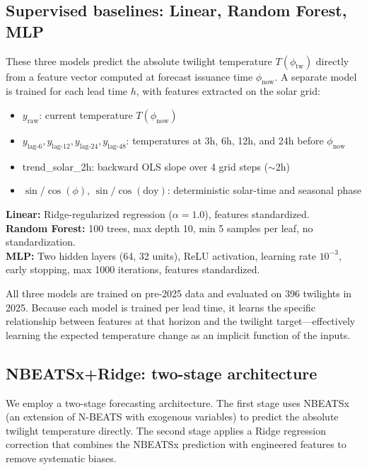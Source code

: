 \documentclass[]{spie}  %
\begin{document}
\subsection{Supervised baselines: Linear, Random Forest, MLP}
\label{sec:methods:baselines}

These three models predict the absolute twilight temperature $T(\phi_{\text{tw}})$ directly from a feature vector computed at forecast issuance time $\phi_{\text{now}}$. A separate model is trained for each lead time $h$, with features extracted on the solar grid:
\begin{itemize}[noitemsep]
    \item $y_{\text{raw}}$: current temperature $T(\phi_{\text{now}})$
    \item $y_{\text{lag-6}}, y_{\text{lag-12}}, y_{\text{lag-24}}, y_{\text{lag-48}}$: temperatures at 3h, 6h, 12h, and 24h before $\phi_{\text{now}}$
    \item trend\_solar\_2h: backward OLS slope over 4 grid steps ($\sim$2h)
    \item $\sin/\cos(\phi)$, $\sin/\cos(\text{doy})$: deterministic solar-time and seasonal phase
\end{itemize}

\noindent\textbf{Linear:} Ridge-regularized regression ($\alpha = 1.0$), features standardized.\\
\textbf{Random Forest:} 100 trees, max depth 10, min 5 samples per leaf, no standardization.\\
\textbf{MLP:} Two hidden layers (64, 32 units), ReLU activation, learning rate $10^{-3}$, early stopping, max 1000 iterations, features standardized.

All three models are trained on pre-2025 data and evaluated on 396 twilights in 2025. Because each model is trained per lead time, it learns the specific relationship between features at that horizon and the twilight target---effectively learning the expected temperature change as an implicit function of the inputs.

\subsection{NBEATSx+Ridge: two-stage architecture}
\label{sec:methods:nbeatsx}

We employ a two-stage forecasting architecture. The first stage uses NBEATSx\cite{Olivares2021} (an extension of N-BEATS\cite{Oreshkin2020} with exogenous variables) to predict the absolute twilight temperature directly. The second stage applies a Ridge regression correction that combines the NBEATSx prediction with engineered features to remove systematic biases.
\end{document}

